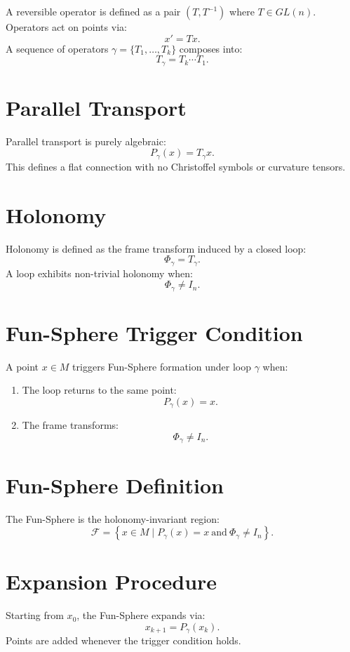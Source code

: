\documentclass[11pt]{article}
\begin{document}
A reversible operator is defined as a pair $(T, T^{-1})$ where
$T \in GL(n)$. Operators act on points via:
\[
x' = T x.
\]
A sequence of operators $\gamma = \{T_1, \dots, T_k\}$ composes into:
\[
T_{\gamma} = T_k \cdots T_1.
\]

\section{Parallel Transport}

Parallel transport is purely algebraic:
\[
P_{\gamma}(x) = T_{\gamma} x.
\]
This defines a flat connection with no Christoffel symbols or curvature
tensors.

\section{Holonomy}

Holonomy is defined as the frame transform induced by a closed loop:
\[
\Phi_{\gamma} = T_{\gamma}.
\]
A loop exhibits non-trivial holonomy when:
\[
\Phi_{\gamma} \neq I_n.
\]

\section{Fun-Sphere Trigger Condition}

A point $x \in M$ triggers Fun-Sphere formation under loop $\gamma$ when:
\begin{enumerate}
    \item The loop returns to the same point:
    \[
    P_{\gamma}(x) = x.
    \]
    \item The frame transforms:
    \[
    \Phi_{\gamma} \neq I_n.
    \]
\end{enumerate}

\section{Fun-Sphere Definition}

The Fun-Sphere is the holonomy-invariant region:
\[
\mathcal{F} =
\left\{
x \in M \mid
P_{\gamma}(x) = x \ \text{and} \ \Phi_{\gamma} \neq I_n
\right\}.
\]

\section{Expansion Procedure}

Starting from $x_0$, the Fun-Sphere expands via:
\[
x_{k+1} = P_{\gamma}(x_k).
\]
Points are added whenever the trigger condition holds.
\end{document}

